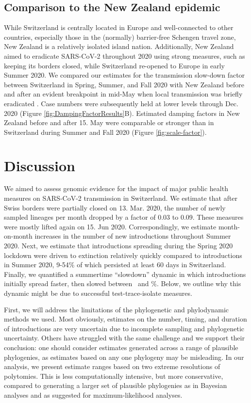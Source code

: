 \documentclass[9pt,twoside,lineno]{pnas-new} %
\begin{document}
\subsection{Comparison to the New Zealand epidemic}
While Switzerland is centrally located in Europe and well-connected to other countries, especially those in the (normally) barrier-free Schengen travel zone, New Zealand is a relatively isolated island nation. Additionally, New Zealand aimed to eradicate SARS-CoV-2 throughout 2020 using strong measures, such as keeping its borders closed, while Switzerland re-opened to Europe in early Summer 2020. We compared our estimates for the transmission slow-down factor between Switzerland in Spring, Summer, and Fall 2020 with New Zealand before and after an evident breakpoint in mid-May when local transmission was briefly eradicated \cite{Geoghegan2020}. Case numbers were subsequently held at lower levels through Dec. 2020 (Figure \ref{fig:DampingFactorResults}B). Estimated damping factors in New Zealand before and after 15. May were comparable or stronger than in Switzerland during Summer and Fall 2020 (Figure \ref{fig:scale-factor}).

\section{Discussion}
We aimed to assess genomic evidence for the impact of major public health measures on SARS-CoV-2 transmission in Switzerland. We estimate that after Swiss borders were partially closed on 13. Mar. 2020, the number of newly sampled lineages per month dropped by a factor of 0.03 to 0.09. These measures were mostly lifted again on 15. Jun 2020. Correspondingly, we estimate month-on-month increases in the number of new introductions throughout Summer 2020. Next, we estimate that introductions spreading during the Spring 2020 lockdown were driven to extinction relatively quickly compared to introductions in Summer 2020, 9-54\% of which persisted at least 60 days in Switzerland. Finally, we quantified a summertime ``slowdown'' dynamic in which introductions initially spread faster, then slowed between \summermaxdampingpercentmedianCHEnosampUB\ and \summermindampingpercentmedianCHEnosampUB \%. Below, we outline why this dynamic might be due to successful test-trace-isolate measures.

First, we will address the limitations of the phylogenetic and phylodynamic methods we used. Most obviously, estimates on the number, timing, and duration of introductions are very uncertain due to incomplete sampling and phylogenetic uncertainty. Others have struggled with the same challenge \cite{Morel2021} and we support their conclusion: one should consider estimates generated across a range of plausible phylogenies, as estimates based on any one phylogeny may be misleading. In our analysis, we present estimate ranges based on two extreme resolutions of polytomies. This is less computationally intensive, but more conservative, compared to generating a larger set of plausible phylogenies as in Bayesian analyses and as \cite{Morel2021} suggested for maximum-likelihood analyses.
\end{document}
